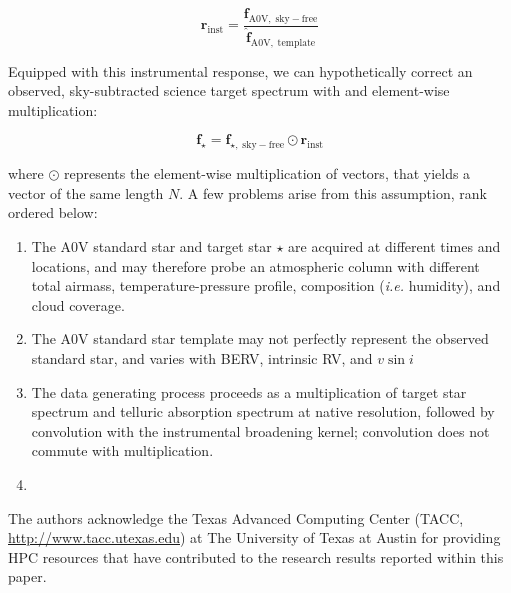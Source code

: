 \documentclass[modern]{aastex631}
\begin{document}
\begin{equation}
  \mathbf{r}_{\mathrm{inst}} = \frac{\mathbf{f}_{\mathrm{A0V,\;sky-free}}}{\mathbf{\hat{f}}_{\mathrm{A0V,\;template}}}
\end{equation}

Equipped with this instrumental response, we can hypothetically correct an observed, sky-subtracted science target spectrum with and element-wise multiplication:

\begin{equation}
  \mathbf{f}_{\mathrm{\star}} = \mathbf{f}_{\mathrm{\star,\;sky-free}} \odot \mathbf{r}_{\mathrm{inst}}
\end{equation}

where $\odot$ represents the element-wise multiplication of vectors, that yields a vector of the same length $N$.  A few problems arise from this assumption, rank ordered below:

\begin{enumerate}
  \item The A0V standard star and target star $\star$ are acquired at different times and locations, and may therefore probe an atmospheric column with different total airmass, temperature-pressure profile, composition (\emph{i.e.} humidity), and cloud coverage.
  \item The A0V standard star template may not perfectly represent the observed standard star, and varies with BERV, intrinsic RV, and $v\sin{i}$
  \item The data generating process proceeds as a multiplication of target star spectrum and telluric absorption spectrum at native resolution, followed by convolution with the instrumental broadening kernel; convolution does not commute with multiplication.
  \item 
\end{enumerate}



\begin{acknowledgements}

The authors acknowledge the Texas Advanced Computing Center (TACC, \url{http://www.tacc.utexas.edu}) at The University of Texas at Austin for providing HPC resources that have contributed to the research results reported within this paper.
\end{acknowledgements}

\clearpage






\end{document}
